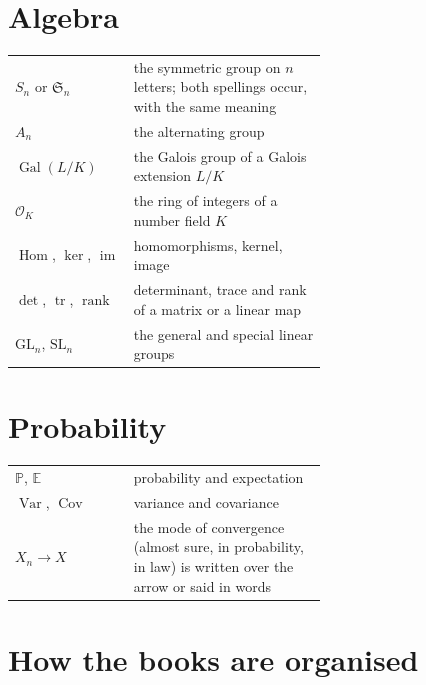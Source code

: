 \section{Algebra}

\begin{center}\small
\begin{tabular}{@{}lp{0.62\linewidth}@{}}
$S_n$ or $\mathfrak S_n$ & the symmetric group on $n$ letters; both spellings occur, with the same meaning\\
$A_n$ & the alternating group\\
$\operatorname{Gal}(L/K)$ & the Galois group of a Galois extension $L/K$\\
$\mathcal O_K$ & the ring of integers of a number field $K$\\
$\operatorname{Hom}$, $\ker$, $\operatorname{im}$ & homomorphisms, kernel, image\\
$\det$, $\operatorname{tr}$, $\operatorname{rank}$ & determinant, trace and rank of a matrix or a linear map\\
$\mathrm{GL}_n$, $\mathrm{SL}_n$ & the general and special linear groups
\end{tabular}
\end{center}

\section{Probability}

\begin{center}\small
\begin{tabular}{@{}lp{0.62\linewidth}@{}}
$\mathbb P$, $\mathbb E$ & probability and expectation\\
$\operatorname{Var}$, $\operatorname{Cov}$ & variance and covariance\\
$X_n\to X$ & the mode of convergence (almost sure, in probability, in law) is written over the arrow or said in words
\end{tabular}
\end{center}

\section{How the books are organised}

